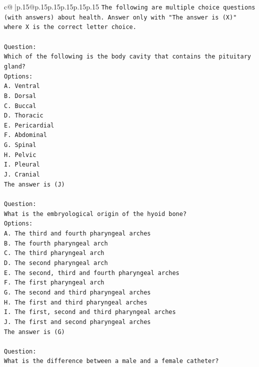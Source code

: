 \documentclass{article}
\begin{document}
{\begin{supertabular}{c@{$\;$}|p{.15\linewidth}@{}p{.15\linewidth}p{.15\linewidth}p{.15\linewidth}p{.15\linewidth}p{.15\linewidth}}
{{{\texttt{The following are multiple choice questions (with answers) about health. Answer only with "The answer is (X)" where X is the correct letter choice.} \\
\\ 
\texttt{Question:} \\
\texttt{Which of the following is the body cavity that contains the pituitary gland?} \\
\texttt{Options:} \\
\texttt{A. Ventral} \\
\texttt{B. Dorsal} \\
\texttt{C. Buccal} \\
\texttt{D. Thoracic} \\
\texttt{E. Pericardial} \\
\texttt{F. Abdominal} \\
\texttt{G. Spinal} \\
\texttt{H. Pelvic} \\
\texttt{I. Pleural} \\
\texttt{J. Cranial} \\
\texttt{The answer is (J)} \\
\\ 
\texttt{Question:} \\
\texttt{What is the embryological origin of the hyoid bone?} \\
\texttt{Options:} \\
\texttt{A. The third and fourth pharyngeal arches} \\
\texttt{B. The fourth pharyngeal arch} \\
\texttt{C. The third pharyngeal arch} \\
\texttt{D. The second pharyngeal arch} \\
\texttt{E. The second, third and fourth pharyngeal arches} \\
\texttt{F. The first pharyngeal arch} \\
\texttt{G. The second and third pharyngeal arches} \\
\texttt{H. The first and third pharyngeal arches} \\
\texttt{I. The first, second and third pharyngeal arches} \\
\texttt{J. The first and second pharyngeal arches} \\
\texttt{The answer is (G)} \\
\\ 
\texttt{Question:} \\
\texttt{What is the difference between a male and a female catheter?} \\
}}}
\end{supertabular}}
\end{document}
